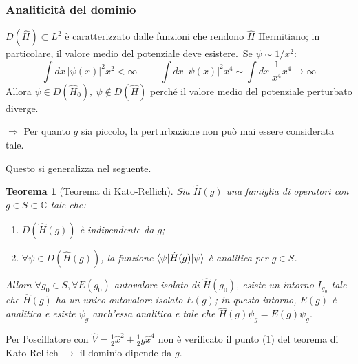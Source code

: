 \documentclass[10pt]{beamer}
\newtheorem{teorema}{Teorema}
\begin{document}
   \begin{frame}
	   \frametitle{Analiticit\`a del dominio}\pause
	   $D(\hat{H}) \subset L^2$ \`e caratterizzato dalle funzioni che rendono $\hat{H}$ Hermitiano; in particolare, il valore medio del potenziale deve esistere.\pause\ Se $\psi \sim 1/x^2$:
	   \begin{equation*}
	   	\int dx \ \lvert \psi (x) \rvert ^2 x^2 < \infty \hspace{1cm} \int dx\ \lvert \psi (x) \rvert ^2 x^4 \sim \int dx\  \frac{1}{x^4}x^4 \to \infty
	   \end{equation*}\pause
	   Allora $\psi \in D(\hat{H}_0),\ \psi \not \in D(\hat{H})$ perch\'e il valore medio del potenziale perturbato diverge.\pause

	   $\Rightarrow $ Per quanto $g$ sia piccolo, la perturbazione non pu\`o mai essere considerata tale.\pause

	   Questo si generalizza nel seguente.
	   \begin{teorema}
		   [Teorema di Kato-Rellich]
		   Sia $\hat{H}(g)$ una famiglia di operatori con $g \in S \subset \mathbb{C}$ tale che:\pause
		   \begin{enumerate}[1]
		   	\item $D(\hat{H}(g))$ \`e indipendente da $g$;\pause
			\item $\forall \psi \in D(\hat{H}(g))$, la funzione $\braket{\psi |\hat{H}(g)|\psi } $ \`e analitica per $g \in S$.\pause
		   \end{enumerate}  
		   Allora $\forall g_0\in S, \forall E(g_0)$ autovalore isolato di $\hat{H}(g_0)$, esiste un intorno $I_{g_0} $ tale che $\hat{H}(g)$ ha un unico autovalore isolato $E(g)$; in questo intorno, $E(g)$ \`e analitica e esiste $\psi _g$ anch'essa analitica e tale che $\hat{H}(g) \psi _g = E(g) \psi _g$.
	   \end{teorema}\pause
	Per l'oscillatore con $\hat{V} = \frac{1}{2} \hat{x}^2 + \frac{1}{2}g \hat{x}^4$ non \`e verificato il punto (1) del teorema di Kato-Rellich $\longrightarrow$ il dominio dipende da $g$.
   \end{frame} 
\end{document}
